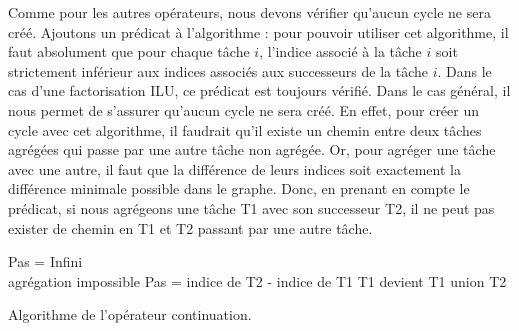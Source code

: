 Comme pour les autres opérateurs, nous devons vérifier qu'aucun cycle ne sera créé.
%
Ajoutons un prédicat à l'algorithme : pour pouvoir utiliser cet algorithme, il faut absolument que pour chaque tâche $i$, l'indice associé à la tâche $i$ soit strictement inférieur aux indices associés aux successeurs de la tâche $i$.
%
Dans le cas d'une factorisation ILU, ce prédicat est toujours vérifié.
%
Dans le cas général, il nous permet de s'assurer qu'aucun cycle ne sera créé.
%
En effet, pour créer un cycle avec cet algorithme, il faudrait qu'il existe un chemin entre deux tâches agrégées qui passe par une autre tâche non agrégée.
%
Or, pour agréger une tâche avec une autre, il faut que la différence de leurs indices soit exactement la différence minimale possible dans le graphe.
%
Donc, en prenant en compte le prédicat, si nous agrégeons une tâche T1 avec son successeur T2, il ne peut pas exister de chemin en T1 et T2 passant par une autre tâche.

\begin{algorithm}
  {\sc Pas} = Infini \\
   {
     {
       {
        \Return agrégation impossible
      }
       {
        {\sc Pas} = indice de {\sc T2} - indice de {\sc T1}
      }
    }
  }
   {
     {
       {
        {\sc T1} devient {\sc T1} union {\sc T2}
      }
    }
  }
  \caption{Algorithme de l'opérateur continuation.}
  \label{algo:algo_C}
\end{algorithm}
